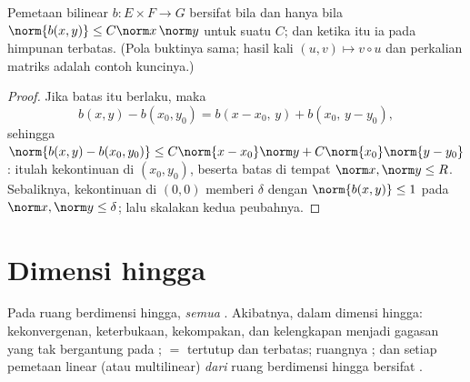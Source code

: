 \begin{proposition}\label{prop:b2:nvs:bilinear}
Pemetaan bilinear $b \colon E \times F \to G$ bersifat  bila dan
hanya bila $\norm{b(x,y)} \leq C\norm x\,\norm y$ untuk suatu $C$; dan
ketika itu ia  pada himpunan terbatas. (Pola buktinya sama;
hasil kali $(u, v) \mapsto v \circ u$ dan perkalian matriks adalah contoh
kuncinya.)
\end{proposition}

\begin{proof}
Jika batas itu berlaku, maka
\[
b(x,y) - b(x_0,y_0) = b(x - x_0,\, y) + b(x_0,\, y - y_0),
\]
sehingga $\norm{b(x,y) - b(x_0,y_0)} \leq C\norm{x - x_0}\norm y +
C\norm{x_0}\norm{y - y_0}$: itulah kekontinuan di $(x_0, y_0)$, beserta
batas  di tempat $\norm x, \norm y \leq R$. Sebaliknya,
kekontinuan di $(0,0)$ memberi $\delta$ dengan $\norm{b(x,y)} \leq 1$ pada
$\norm x, \norm y \leq \delta$; lalu skalakan kedua peubahnya.
\end{proof}

\section{Dimensi hingga}

\begin{theorem}\label{thm:b2:nvs:finitedim}
Pada ruang berdimensi hingga, \emph{semua }. Akibatnya, dalam dimensi
hingga: kekonvergenan, keterbukaan, kekompakan, dan kelengkapan menjadi
gagasan yang tak bergantung pada ;  $=$ tertutup dan
terbatas; ruangnya ; dan setiap pemetaan linear (atau
multilinear) \emph{dari} ruang berdimensi hingga bersifat .
\end{theorem}

